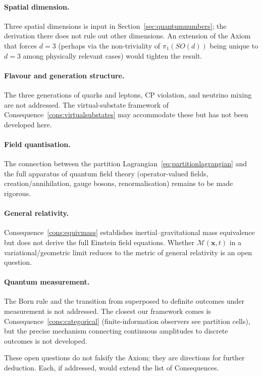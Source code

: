\documentclass[11pt,twocolumn,a4paper]{article}
\theoremstyle{axiomstyle}
\theoremstyle{conseqstyle}
\theoremstyle{definition}
\theoremstyle{remark}
\newcommand{\Depth}{\mathcal{M}}
\begin{document}
\paragraph{Spatial dimension.} Three spatial dimensions is input in Section~\ref{sec:quantumnumbers}; the derivation there does not rule out other dimensions. An extension of the Axiom that forces $d=3$ (perhaps via the non-triviality of $\pi_{1}(SO(d))$ being unique to $d=3$ among physically relevant cases) would tighten the result.

\paragraph{Flavour and generation structure.} The three generations of quarks and leptons, CP violation, and neutrino mixing are not addressed. The virtual-substate framework of Consequence~\ref{cons:virtualsubstates} may accommodate these but has not been developed here.

\paragraph{Field quantisation.} The connection between the partition Lagrangian~\eqref{eq:partitionlagrangian} and the full apparatus of quantum field theory (operator-valued fields, creation/annihilation, gauge bosons, renormalisation) remains to be made rigorous.

\paragraph{General relativity.} Consequence~\ref{cons:equivmass} establishes inertial--gravitational mass equivalence but does not derive the full Einstein field equations. Whether $\Depth(\mathbf{x},t)$ in a variational/geometric limit reduces to the metric of general relativity is an open question.

\paragraph{Quantum measurement.} The Born rule and the transition from superposed to definite outcomes under measurement is not addressed. The closest our framework comes is Consequence~\ref{cons:categorical} (finite-information observers see partition cells), but the precise mechanism connecting continuous amplitudes to discrete outcomes is not developed.

These open questions do not falsify the Axiom; they are directions for further deduction. Each, if addressed, would extend the list of Consequences.
\end{document}
